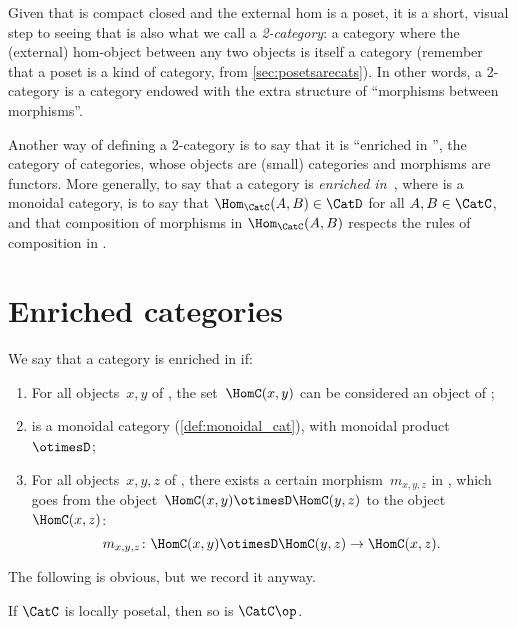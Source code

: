Given that \DP is compact closed and the external hom is a poset, it is a short, visual step to seeing that \DP is also what we call a \emph{2-category}: a category where the (external) hom-object between any two objects is itself a category (remember that a poset is a kind of category, from \cref{sec:posetsarecats}). In other words, a 2-category is a category endowed with the extra structure of ``morphisms between morphisms''.

Another way of defining a 2-category is to say that it is ``enriched in \Category'', the category of categories, whose objects are (small) categories and morphisms are functors. More generally, to say that a category \CatC is \emph{enriched in~\CatD}, where \CatD is a monoidal category, is to say that $\Hom_\CatC(A,B) \in \CatD$ for all $A,B \in \CatC$, and that composition of morphisms in $\Hom_\CatC(A,B)$ respects the rules of composition in \CatD.


\section{Enriched categories}\label{sec:enrichment-enriched-categories}

\begin{ctdefinition}
    \label{def:enriched-category}
    We say that a category \CatC is enriched in \CatD if:
    \begin{enumerate}
        \item For all objects~$x, y$ of \CatC, the set~$\HomC(x,y)$ can be considered an object of \CatD;
        \item \CatD is a monoidal category (\cref{def:monoidal_cat}),
        with monoidal product~$\otimesD$;
        \item For all objects~$x, y, z$ of \CatC, there exists
        a certain morphism~$m_{x,y,z}$ in \CatD,
        which goes from the object~$\HomC(x, y) \otimesD \HomC(y, z)$ to the object~$\HomC(x, z)$:
        \begin{equation}
            \label{eq:enriched-condition}
            m_{x,y,z} \colon \HomC(x, y) \otimesD \HomC(y, z) \to \HomC(x, z).
        \end{equation}
    \end{enumerate}
\end{ctdefinition}

%
 The following is obvious, but we record it anyway.
\begin{lemma}\label{lem:loc_pos_op}
If $\CatC$ is locally posetal, then so is $\CatC\op$.
\end{lemma}

